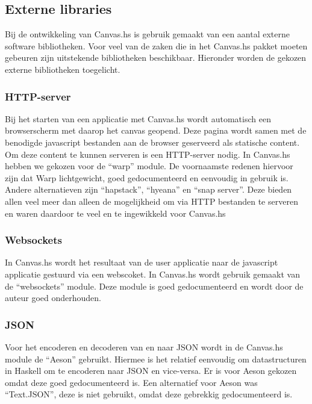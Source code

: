 \subsection{Externe libraries}
\label{subsec:externe_libraries}
Bij de ontwikkeling van Canvas.hs is gebruik gemaakt van een aantal externe software bibliotheken. Voor veel van de zaken die in het Canvas.hs pakket moeten gebeuren zijn uitstekende bibliotheken beschikbaar. Hieronder worden de gekozen externe bibliotheken toegelicht.


\subsubsection{HTTP-server}
Bij het starten van een applicatie met Canvas.hs wordt automatisch een browserscherm met daarop het canvas geopend. Deze pagina wordt samen met de benodigde javascript bestanden aan de browser geserveerd als statische content. Om deze content te kunnen serveren is een HTTP-server nodig. In Canvas.hs hebben we gekozen voor de ``warp'' module. De voornaamste redenen hiervoor zijn dat Warp lichtgewicht, goed gedocumenteerd en eenvoudig in gebruik is. Andere alternatieven zijn ``hapstack'', ``hyeana'' en ``snap server''. Deze bieden allen veel meer dan alleen de mogelijkheid om via HTTP bestanden te serveren en waren daardoor te veel en te ingewikkeld voor Canvas.hs

\subsubsection{Websockets}
In Canvas.hs wordt het resultaat van de user applicatie naar de javascript applicatie gestuurd via een webscoket. In Canvas.hs wordt gebruik gemaakt van de ``websockets'' module. Deze module is goed gedocumenteerd en wordt door de auteur goed onderhouden.

\subsubsection{JSON}
Voor het encoderen en decoderen van en naar JSON wordt in de Canvas.hs module de ``Aeson'' gebruikt. Hiermee is het relatief eenvoudig om datastructuren in Haskell om te encoderen naar JSON en vice-versa. Er is voor Aeson gekozen omdat deze goed gedocumenteerd is. Een alternatief voor Aeson was ``Text.JSON'', deze is niet gebruikt, omdat deze gebrekkig gedocumenteerd is.

